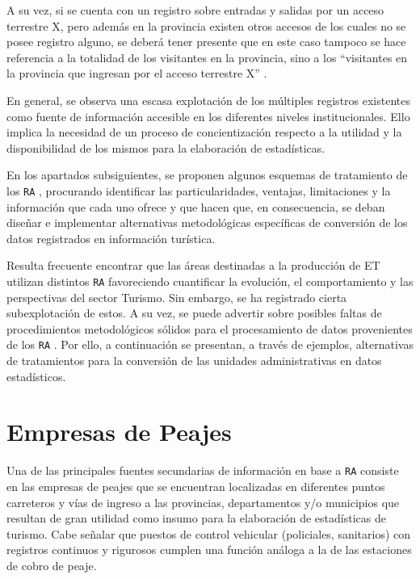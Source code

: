 \documentclass[
]{book}
\begin{document}
A su vez, si se cuenta con un registro sobre entradas y salidas por un acceso terrestre X, pero además en la provincia existen otros accesos de los cuales no se posee registro alguno, se deberá tener presente que en este caso tampoco se hace referencia a la totalidad de los visitantes en la provincia, sino a los ``visitantes en la provincia que ingresan por el acceso terrestre X'' .

En general, se observa una escasa explotación de los múltiples registros existentes como fuente de información accesible en los diferentes niveles institucionales. Ello implica la necesidad de un proceso de concientización respecto a la utilidad y la disponibilidad de los mismos para la elaboración de estadísticas.

En los apartados subsiguientes, se proponen algunos esquemas de tratamiento de los \texttt{RA} , procurando identificar las particularidades, ventajas, limitaciones y la información que cada uno ofrece y que hacen que, en consecuencia, se deban diseñar e implementar alternativas metodológicas específicas de conversión de los datos registrados en información turística.

Resulta frecuente encontrar que las áreas destinadas a la producción de ET utilizan distintos \texttt{RA} favoreciendo cuantificar la evolución, el comportamiento y las perspectivas del sector Turismo. Sin embargo, se ha registrado cierta subexplotación de estos. A su vez, se puede advertir sobre posibles faltas de procedimientos metodológicos sólidos para el procesamiento de datos provenientes de los \texttt{RA} . Por ello, a continuación se presentan, a través de ejemplos, alternativas de tratamientos para la conversión de las unidades administrativas en datos estadísticos.

\hypertarget{empresas-de-peajes}{%
\section{Empresas de Peajes}\label{empresas-de-peajes}}

Una de las principales fuentes secundarias de información en base a \texttt{RA} consiste en las empresas de peajes que se encuentran localizadas en diferentes puntos carreteros y vías de ingreso a las provincias, departamentos y/o municipios que resultan de gran utilidad como insumo para la elaboración de estadísticas de turismo. Cabe señalar que puestos de control vehicular (policiales, sanitarios) con registros continuos y rigurosos cumplen una función análoga a la de las estaciones de cobro de peaje.
\end{document}
